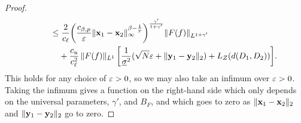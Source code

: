 \documentclass[12pt]{report}
\begin{document}
\begin{proof}
\begin{align}
        &\qquad
            \le
            \frac{2}{c_\ell}
            \parens*{
                \frac{c_{\beta, p}}{\e} \norm{\vx_1 - \vx_2}_\infty^{\beta - \frac{1}{p}}
            }^{\frac{\gamma'}{1 + \gamma'}}
            \norm{F(f)}_{L^{1 + \gamma'}}
            \nonumber \\
        &\qquad\phantom{\le}\;
            + \frac{c_u}{c_\ell^2}\,\norm{F(f)}_{L^1}
            \,\sbrac*{
                \frac{1}{\underline{\sigma}^2}(
                    \sqrt{N}\e
                    + \norm{\vy_1 - \vy_2}_2
                )
                + L_Z(d(D_1, D_2))
            }.
    \end{align}
    This holds for any choice of $\varepsilon > 0$,
    so we may also take an infimum over $\varepsilon > 0$.
    Taking the infimum gives a function on the right-hand side which only depends on the universal parameters, $\gamma'$, and $B_F$, and which goes to zero as $\lVert\mathbf{x}_1 - \mathbf{x}_2\rVert_2$ and $\lVert\mathbf{y}_1 - \mathbf{y}_2\rVert_2$ go to zero.
\end{proof}
\end{document}
